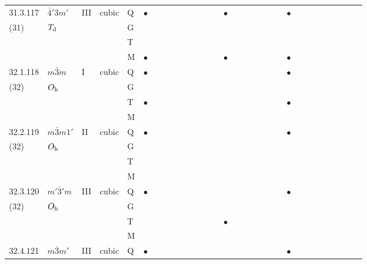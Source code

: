 \documentclass[fleqn,9pt,landscape]{jsarticle}
\begin{document}
\begin{longtable}{lllll|l|lll|ll|lll|l|lll|lll|l|ll|lll|lll}
31.3.117 & \texttt{$\bar{4}'3m'$} & III & cubic & Q & $\bullet$ &  &  &  &  &  &  &  &  & $\bullet$ &  &  &  &  &  &  & $\bullet$ &  &  &  &  &  &  &  &  \\
(31) & $T_{\rm d}$ &  &  & G &  &  &  &  &  &  &  &  &  &  &  &  &  &  &  &  &  &  &  &  &  &  &  &  &  \\
 &  &  &  & T &  &  &  &  &  &  &  &  &  &  &  &  &  &  &  &  &  &  &  &  &  &  &  &  &  \\
 &  &  &  & M & $\bullet$ &  &  &  &  &  &  &  &  & $\bullet$ &  &  &  &  &  &  & $\bullet$ &  &  &  &  &  &  &  &  \\ \hline
32.1.118 & \texttt{$m\bar{3}m$} & I & cubic & Q & $\bullet$ &  &  &  &  &  &  &  &  &  &  &  &  &  &  &  & $\bullet$ &  &  &  &  &  &  &  &  \\
(32) & $O_{\rm h}$ &  &  & G &  &  &  &  &  &  &  &  &  &  &  &  &  &  &  &  &  &  &  &  &  &  &  &  &  \\
 &  &  &  & T & $\bullet$ &  &  &  &  &  &  &  &  &  &  &  &  &  &  &  & $\bullet$ &  &  &  &  &  &  &  &  \\
 &  &  &  & M &  &  &  &  &  &  &  &  &  &  &  &  &  &  &  &  &  &  &  &  &  &  &  &  &  \\ \hline
32.2.119 & \texttt{$m\bar{3}m1'$} & II & cubic & Q & $\bullet$ &  &  &  &  &  &  &  &  &  &  &  &  &  &  &  & $\bullet$ &  &  &  &  &  &  &  &  \\
(32) & $O_{\rm h}$ &  &  & G &  &  &  &  &  &  &  &  &  &  &  &  &  &  &  &  &  &  &  &  &  &  &  &  &  \\
 &  &  &  & T &  &  &  &  &  &  &  &  &  &  &  &  &  &  &  &  &  &  &  &  &  &  &  &  &  \\
 &  &  &  & M &  &  &  &  &  &  &  &  &  &  &  &  &  &  &  &  &  &  &  &  &  &  &  &  &  \\ \hline
32.3.120 & \texttt{$m'\bar{3}'m$} & III & cubic & Q & $\bullet$ &  &  &  &  &  &  &  &  &  &  &  &  &  &  &  & $\bullet$ &  &  &  &  &  &  &  &  \\
(32) & $O_{\rm h}$ &  &  & G &  &  &  &  &  &  &  &  &  &  &  &  &  &  &  &  &  &  &  &  &  &  &  &  &  \\
 &  &  &  & T &  &  &  &  &  &  &  &  &  & $\bullet$ &  &  &  &  &  &  &  &  &  &  &  &  &  &  &  \\
 &  &  &  & M &  &  &  &  &  &  &  &  &  &  &  &  &  &  &  &  &  &  &  &  &  &  &  &  &  \\ \hline
32.4.121 & \texttt{$m\bar{3}m'$} & III & cubic & Q & $\bullet$ &  &  &  &  &  &  &  &  &  &  &  &  &  &  &  & $\bullet$ &  &  &  &  &  &  &  &  \\

\end{longtable}
\end{document}
